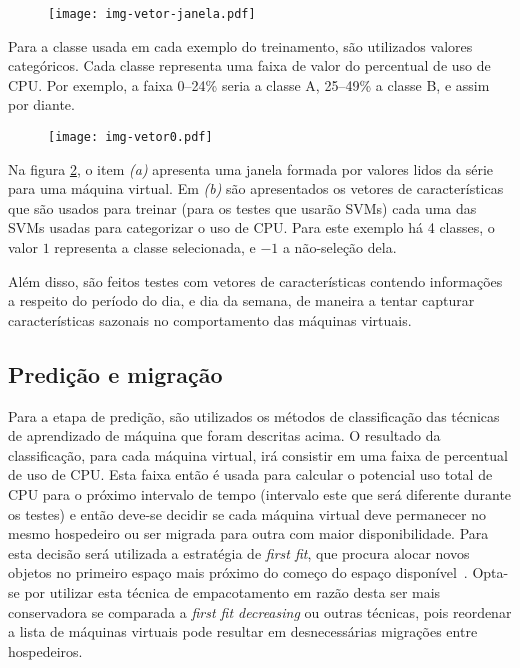 \begin{figure}[htp]
\centering
\texttt{[image: img-vetor-janela.pdf]}
\label{fig:vetorjanela}
\end{figure}

Para a classe usada em cada exemplo do treinamento, são utilizados
valores categóricos. Cada classe representa uma faixa de valor do
percentual de uso de CPU. Por exemplo, a faixa 0--24\% seria a classe
A, 25--49\% a classe B, e assim por diante.

\begin{figure}[htp]
\centering
\texttt{[image: img-vetor0.pdf]}
\label{fig:vetor0}
\end{figure}

Na figura \ref{fig:vetor0}, o item \emph{(a)} apresenta uma janela
formada por valores lidos da série para uma máquina virtual. Em \emph{(b)}
são apresentados os vetores de características que são usados para treinar
(para os testes que usarão SVMs) cada uma das SVMs usadas para categorizar
o uso de CPU. Para este exemplo há 4 classes, o valor $1$ representa a
classe selecionada, e $-1$ a não-seleção dela.

Além disso, são feitos testes com vetores de características contendo
informações a respeito do período do dia, e dia da semana, de maneira a
tentar capturar características sazonais no comportamento das máquinas
virtuais.

\subsection{Predição e migração}

Para a etapa de predição, são utilizados os métodos de classificação das
técnicas de aprendizado de máquina que foram descritas acima. O resultado da
classificação, para cada máquina virtual, irá consistir em uma faixa de
percentual de uso de CPU. Esta faixa então é usada para calcular o
potencial uso total de CPU para o próximo intervalo de tempo (intervalo este
que será diferente durante os testes) e então deve-se decidir se cada máquina
virtual deve permanecer no mesmo hospedeiro ou ser migrada para outra com maior
disponibilidade. Para esta decisão será utilizada a estratégia de \emph{first
fit}, que procura alocar novos objetos no primeiro espaço mais próximo do
começo do espaço disponível~\cite{yao1980new}. Opta-se por utilizar esta
técnica de empacotamento em razão desta ser mais conservadora se comparada a
\emph{first fit decreasing} ou outras técnicas, pois reordenar a lista de
máquinas virtuais pode resultar em desnecessárias migrações entre hospedeiros.

